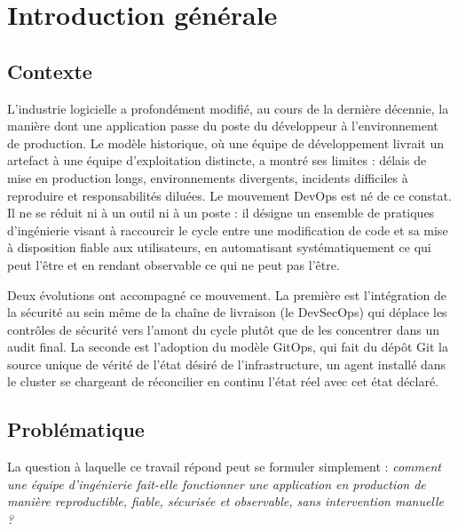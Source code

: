 \documentclass[12pt,a4paper,twoside,openright]{report}
\makeatletter
\def\cleardoublepage{\clearpage\if@twoside
  \ifodd\c@page\else\hbox{}\thispagestyle{empty}\newpage\fi\fi}
\makeatother
\begin{document}
\cleardoublepage
{}

\chapter*{Introduction générale}

\section*{Contexte}

L'industrie logicielle a profondément modifié, au cours de la dernière décennie, la
manière dont une application passe du poste du développeur à l'environnement de
production. Le modèle historique, où une équipe de développement livrait un artefact
à une équipe d'exploitation distincte, a montré ses limites : délais de mise en
production longs, environnements divergents, incidents difficiles à reproduire et
responsabilités diluées. Le mouvement DevOps est né de ce constat. Il ne se réduit
ni à un outil ni à un poste : il désigne un ensemble de pratiques d'ingénierie
visant à raccourcir le cycle entre une modification de code et sa mise à disposition
fiable aux utilisateurs, en automatisant systématiquement ce qui peut l'être et en
rendant observable ce qui ne peut pas l'être.

Deux évolutions ont accompagné ce mouvement. La première est l'intégration de la
sécurité au sein même de la chaîne de livraison (le DevSecOps) qui déplace les
contrôles de sécurité vers l'amont du cycle plutôt que de les concentrer dans un
audit final. La seconde est l'adoption du modèle GitOps, qui fait du dépôt Git la
source unique de vérité de l'état désiré de l'infrastructure, un agent installé dans
le cluster se chargeant de réconcilier en continu l'état réel avec cet état déclaré.

\section*{Problématique}

La question à laquelle ce travail répond peut se formuler simplement :
\emph{comment une équipe d'ingénierie fait-elle fonctionner une application en
production de manière reproductible, fiable, sécurisée et observable, sans
intervention manuelle ?}
\end{document}
